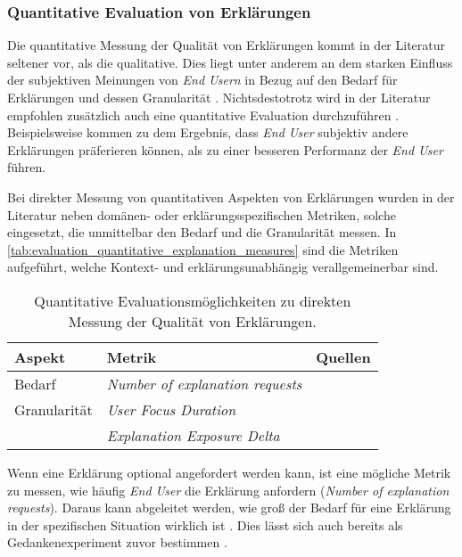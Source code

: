 \subsubsection{Quantitative Evaluation von Erklärungen}

Die quantitative Messung der Qualität von Erklärungen kommt in der Literatur seltener vor, als die qualitative. Dies liegt unter anderem an dem starken Einfluss der subjektiven Meinungen von \textit{End Usern} in Bezug auf den Bedarf für Erklärungen und dessen Granularität \citeauthor{chazette_end-users_nodate, kouki_user_2017}. Nichtsdestotrotz wird in der Literatur empfohlen zusätzlich auch eine quantitative Evaluation durchzuführen \cite{balog_measuring_2020}. Beispielsweise kommen \citeauthor{wiegand2019drive} zu dem Ergebnis, dass \textit{End User} subjektiv andere Erklärungen präferieren können, als zu einer besseren Performanz der \textit{End User} führen.

Bei direkter Messung von quantitativen Aspekten von Erklärungen wurden in der Literatur neben domänen- oder erklärungsspezifischen Metriken, solche eingesetzt, die unmittelbar den Bedarf und die Granularität messen. In \autoref{tab:evaluation_quantitative_explanation_measures} sind die Metriken aufgeführt, welche Kontext- und erklärungsunabhängig verallgemeinerbar sind.

\begin{table}[htb!]
    \centering
    \begin{tabular}{|p{}|p{}|p{}|}
        \hline
        \textbf{Aspekt} & \textbf{Metrik} & \textbf{Quellen} \\
        \hline
        \hline
        Bedarf          & \textit{Number of explanation requests}
            & \cite{wiegand_id_2020} \cite{ chazette_end-users_nodate} \cite{balog_measuring_2020} \\
        \hline
        Granularität    & \textit{User Focus Duration} & \cite{balog_measuring_2020} \\
                        & \textit{Explanation Exposure Delta} & \cite{nunes_systematic_2017}\\
        \hline
    \end{tabular}
    \caption{Quantitative Evaluationsmöglichkeiten zu direkten Messung der Qualität von Erklärungen.}
    \label{tab:evaluation_quantitative_explanation_measures}
\end{table}

Wenn eine Erklärung optional angefordert werden kann, ist eine mögliche Metrik zu messen, wie häufig \textit{End User} die Erklärung anfordern (\textit{Number of explanation requests}). Daraus kann abgeleitet werden, wie groß der Bedarf für eine Erklärung in der spezifischen Situation wirklich ist \cite{wiegand_id_2020}. Dies lässt sich auch bereits als Gedankenexperiment zuvor bestimmen \cite[vgl.][]{chazette_end-users_nodate}.

